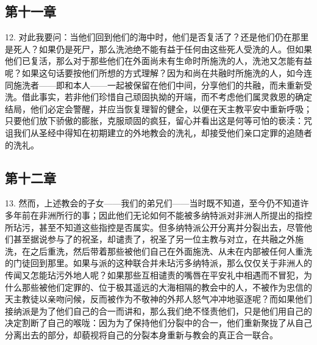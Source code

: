 
\subsection{第十一章}

12. 对此我要问：当他们回到他们的海中时，他们是否复活了？还是他们仍在那里是死人？如果仍是死尸，那么洗池绝不能有益于任何由这些死人受洗的人。但如果他们已复活，那么对于那些他们在外面尚未有生命时所施洗的人，洗池又怎能有益呢？如果这句话要按他们所想的方式理解？因为和尚在共融时所施洗的人，如今连同施洗者——即和本人——一起被保留在他们中间，分享他们的共融，而未重新受洗。借此事实，若非他们珍惜自己顽固执拗的开端，而不考虑他们属灵救恩的确定结局，他们必定会警醒，并应当恢复理智的健全，以便在天主教平安中重新呼吸；只要他们放下骄傲的膨胀，克服顽固的疯狂，留心并看出这是何等可怕的亵渎：咒诅我们从圣经中得知在初期建立的外地教会的洗礼，却接受他们亲口定罪的追随者的洗礼。\par


\subsection{第十二章}

13. 然而，上述教会的子女——我们的弟兄们——当时既不知道，至今仍不知道许多年前在非洲所行的事；因此他们无论如何不能被多纳特派对非洲人所提出的指控所玷污，甚至不知道这些指控是否属实。但多纳特派公开分离并分裂出去，尽管他们甚至据说参与了的祝圣，却谴责了，祝圣了另一位主教与对立，在共融之外施洗，在之后重洗，然后带着那些被他们自己在外面施洗、从未在内部被任何人重洗的门徒回到那里。如果与派的这种联合并未玷污多纳特派，那么仅仅关于非洲人的传闻又怎能玷污外地人呢？如果那些互相谴责的嘴唇在平安礼中相遇而不冒犯，为什么那些被他们定罪的、位于极其遥远的大海相隔的教会中的人，不被作为忠信的天主教徒以亲吻问候，反而被作为不敬神的外邦人怒气冲冲地驱逐呢？而如果他们接纳派是为了他们自己的合一而讲和，那么我们绝不怪责他们，只是他们用自己的决定割断了自己的喉咙：因为为了保持他们分裂中的合一，他们重新聚拢了从自己分离出去的部分，却藐视将自己的分裂本身重新与教会的真正合一联合。\par

